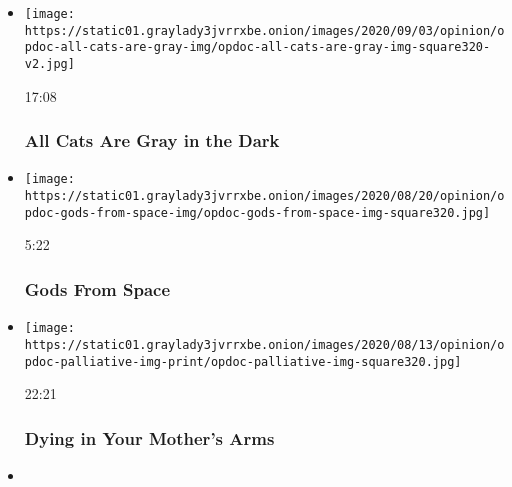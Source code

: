 \begin{itemize}
\item
  \href{https://www.nytimes3xbfgragh.onion/video/opinion/100000007304962/all-cats-are-gray-in-the-dark.html?action=click\&module=video-series-bar\&region=header\&pgtype=Article\&playlistId=video/op-docs}{}

  \texttt{[image: https://static01.graylady3jvrrxbe.onion/images/2020/09/03/opinion/opdoc-all-cats-are-gray-img/opdoc-all-cats-are-gray-img-square320-v2.jpg]}

  17:08

  \hypertarget{all-cats-are-gray-in-the-dark}{%
  \subsubsection{All Cats Are Gray in the
  Dark}\label{all-cats-are-gray-in-the-dark}}
\item
  \href{https://www.nytimes3xbfgragh.onion/video/opinion/100000006831441/gods-from-space.html?action=click\&module=video-series-bar\&region=header\&pgtype=Article\&playlistId=video/op-docs}{}

  \texttt{[image: https://static01.graylady3jvrrxbe.onion/images/2020/08/20/opinion/opdoc-gods-from-space-img/opdoc-gods-from-space-img-square320.jpg]}

  5:22

  \hypertarget{gods-from-space}{%
  \subsubsection{Gods From Space}\label{gods-from-space}}
\item
  \href{https://www.nytimes3xbfgragh.onion/video/opinion/100000007249913/dying-in-your-mothers-arms.html?action=click\&module=video-series-bar\&region=header\&pgtype=Article\&playlistId=video/op-docs}{}

  \texttt{[image: https://static01.graylady3jvrrxbe.onion/images/2020/08/13/opinion/opdoc-palliative-img-print/opdoc-palliative-img-square320.jpg]}

  22:21

  \hypertarget{dying-in-your-mothers-arms}{%
  \subsubsection{Dying in Your Mother's
  Arms}\label{dying-in-your-mothers-arms}}
\item
  \href{https://www.nytimes3xbfgragh.onion/video/opinion/100000007247238/tears-teacher.html?action=click\&module=video-series-bar\&region=header\&pgtype=Article\&playlistId=video/op-docs}{}


\end{itemize}
